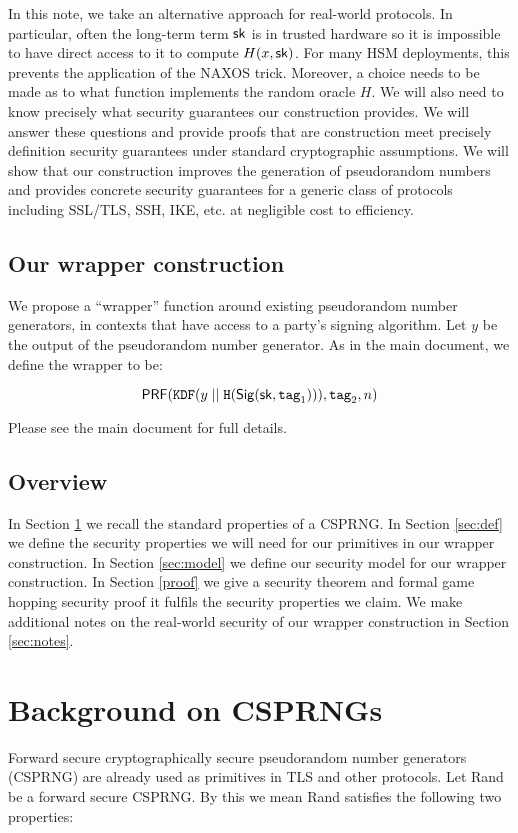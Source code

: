 \documentclass[12pt]{article}
\newcommand{\myconcat}{ \;||\; }
\begin{document}
In this note, we take an alternative approach for real-world protocols.
In particular, often the long-term term $\mathsf{sk}$ is in trusted hardware so
it is impossible to have direct access to it to compute $H(x, \mathsf{sk})$.
For many HSM deployments, this prevents the application of the NAXOS
trick.
Moreover, a choice needs to be made as to what function implements the
random oracle $H$. We will also need to know precisely what security
guarantees our construction provides.  We will answer these questions
and provide proofs that are construction meet precisely definition
security guarantees under standard cryptographic assumptions. We will
show that our construction improves the generation of pseudorandom
numbers and provides concrete security guarantees for a generic class of
protocols including SSL/TLS, SSH, IKE, etc. at negligible cost to efficiency. 

\subsection*{Our wrapper construction}

We propose a ``wrapper'' function around existing
pseudorandom number generators, in contexts that have access to a
party's signing algorithm. Let $y$ be the output of the pseudorandom
number generator. As in the main document, we define the wrapper to be:

$$
\prf(\texttt{KDF}(y \myconcat \texttt{H}(\sig (\sk, \mathrm{\texttt{tag}_1}))), \texttt{tag}_2, n)
$$

\noindent Please see the main document for full details.

\subsection*{Overview}
In Section \ref{CSPRNG} we recall the standard properties of a CSPRNG. In Section \ref{sec:def} we define the security properties we will need for our primitives in our wrapper construction. In Section \ref{sec:model} we define our security model for our wrapper construction. In Section \ref{proof} we give a security theorem and formal game hopping security proof it fulfils the security properties we claim. We make additional notes on the real-world security of our wrapper construction in Section \ref{sec:notes}.


\section{Background on CSPRNGs} \label{CSPRNG}
Forward secure cryptographically secure pseudorandom number generators (CSPRNG) are already used as primitives in TLS and other protocols. Let Rand be a forward secure CSPRNG. By this we mean Rand satisfies the following two properties:
\end{document}
